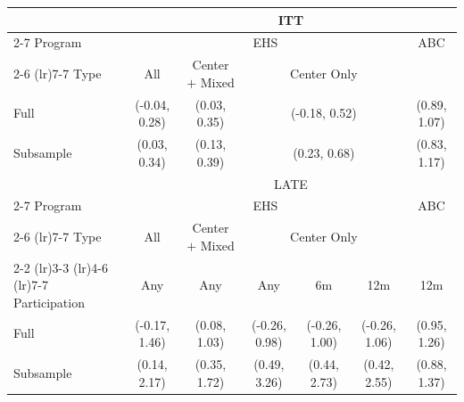 \begin{tabular}{lcccccc}
\toprule 
\midrule 
 & \multicolumn{6}{c}{ITT} \\
 \cmidrule(lr){2-7} 
Program  & \multicolumn{5}{c}{EHS} & ABC \\
 \cmidrule(lr){2-6} \cmidrule(lr){7-7} 
Type & All & Center $+$ Mixed & \multicolumn{3}{c}{Center Only} &  \\
\midrule 
Full & (-0.04, 0.28) & (0.03, 0.35) & \multicolumn{3}{c}{(-0.18, 0.52)} & (0.89, 1.07) \\
Subsample & (0.03, 0.34) & (0.13, 0.39) & \multicolumn{3}{c}{(0.23, 0.68)} & (0.83, 1.17) \\
\midrule 
\midrule 
 & \multicolumn{6}{c}{LATE} \\
 \cmidrule(lr){2-7} 
Program  & \multicolumn{5}{c}{EHS} & ABC \\
 \cmidrule(lr){2-6} \cmidrule(lr){7-7} 
Type & All & Center $+$ Mixed & \multicolumn{3}{c}{Center Only} &  \\
 \cmidrule(lr){2-2} \cmidrule(lr){3-3} \cmidrule(lr){4-6} \cmidrule(lr){7-7} 
Participation & Any & Any & Any & 6m & 12m & 12m \\
\midrule 
Full & (-0.17, 1.46) & (0.08, 1.03) & (-0.26, 0.98) & (-0.26, 1.00) & (-0.26, 1.06) & (0.95, 1.26) \\
Subsample & (0.14, 2.17) & (0.35, 1.72) & (0.49, 3.26) & (0.44, 2.73) & (0.42, 2.55) & (0.88, 1.37) \\
\midrule 
\bottomrule 
\end{tabular}
